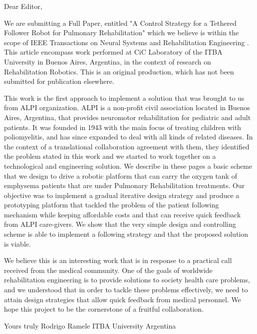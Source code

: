 Dear Editor, 

We are submitting a Full Paper, entitled "A Control Strategy for a Tethered Follower Robot for Pulmonary Rehabilitation" which we believe is within the scope of IEEE Transactions on Neural Systems and Rehabilitation Engineering .  This article encompass work performed at CiC Laboratory of the ITBA University in Buenos Aires, Argentina, in the context of research on Rehabilitation Robotics.  This is an original production, which has not been submitted for publication elsewhere.

This work is the first approach to implement a solution that was brought to us from ALPI organization.  ALPI is a non-profit civil association located in Buenos Aires, Argentina, that provides neuromotor rehabilitation for pediatric and adult patients. It was founded in 1943 with the main focus of treating children with poliomyelitis, and has since expanded to deal with all kinds of related diseases.  In the context of a translational collaboration agreement with them, they identified the problem stated in this work and we started to work together on a technological and engineering solution.  We describe in these pages a basic scheme that we design to drive a robotic platform that can carry the oxygen tank of emphysema patients that are under Pulmonary Rehabilitation treatments.  Our objective was to implement a gradual iterative design strategy and produce a prototyping platform that tackled the problem of the patient following mechanism while keeping affordable costs and that can receive quick feedback from ALPI care-givers.  We show that the very simple design and controlling scheme is able to implement a following strategy and that the proposed solution is viable.

We believe this is an interesting work that is in response to a practical call received from the medical community.  One of the goals of worldwide rehabilitation engineering is to provide solutions to society health care problems, and we understood that in order to tackle these problems effectively, we need to attain design strategies that allow quick feedback from medical personnel.  We hope this project to be the cornerstone of a fruitful collaboration.

Yours truly
Rodrigo Ramele
ITBA University 
Argentina